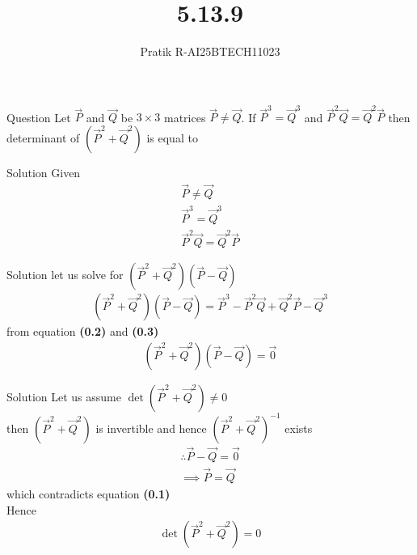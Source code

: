 \documentclass{beamer}
\title 
{5.13.9}
\author 
{Pratik R-AI25BTECH11023}
\begin{document}
\frame{\titlepage}
\begin{frame}{Question}
Let $\vec{P}$ and $\vec{Q}$ be $3\times 3$ matrices $\vec{P}\neq \vec{Q}$. If $\vec{P}^3 = \vec{Q}^3$ and $\vec{P}^2\vec{Q}=\vec{Q}^2\vec{P}$ then determinant of $(\vec{P}^2+\vec{Q}^2)$ is equal to 
\end{frame}
\begin{frame}{Solution}
Given
\begin{align}
  \vec{P}\neq \vec{Q} \\
  \vec{P}^3 = \vec{Q}^3 \\
  \vec{P}^2\vec{Q}=\vec{Q}^2\vec{P}
\end{align}
\end{frame}
\begin{frame}{Solution}
let us solve for $(\vec{P}^2+\vec{Q}^2)(\vec{P}-\vec{Q})$
\begin{align}
   (\vec{P}^2+\vec{Q}^2)(\vec{P}-\vec{Q}) = \vec{P}^3 - \vec{P}^2\vec{Q} + \vec{Q}^2\vec{P} - \vec{Q}^3
\end{align}
from equation \textbf{(0.2)} and \textbf{(0.3)}
\begin{align}
 (\vec{P}^2+\vec{Q}^2)(\vec{P}-\vec{Q}) =\vec{0}
\end{align}
\end{frame}
\begin{frame}{Solution}
Let us assume $\det(\vec{P}^2+\vec{Q}^2) \neq 0$ \\
then $(\vec{P}^2+\vec{Q}^2)$ is invertible and hence 
$(\vec{P}^2+\vec{Q}^2)^{-1}$ exists
\begin{align}
   \therefore \vec{P}-\vec{Q} =\vec{0} \\
   \implies \vec{P}=\vec{Q}
\end{align}
which contradicts equation \textbf{(0.1)}\\
Hence 
\begin{align}
    \det(\vec{P}^2+\vec{Q}^2)= 0
\end{align}
\end{frame}
\end{document}
